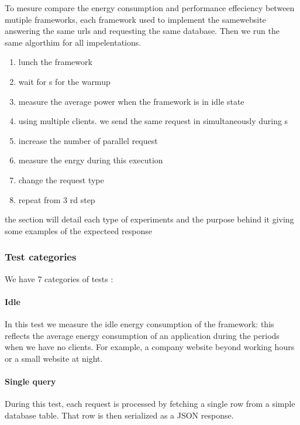 To mesure compare the energy consumption and performance effeciency between mutiple frameworks, each framework used to implement the samewebsite answering the same urls and requesting the same database. Then we run the same algorthim for all impelentations.
\begin{enumerate}
    \item lunch the framework
    \item wait for \duration s for the warmup
    \item measure the average power when the framework is in idle state
    \item using multiple clients. we send the same request in simultaneously during \duration s
    \item increase the number of parallel request
    \item measure the enrgy during this execution
    \item change the request type
    \item repeat from 3 rd step
\end{enumerate}
the section will detail each type of experiments  and the purpose behind it giving some examples of the expecteed response

\subsubsection{Test categories }
We have 7 categories of tests :

\paragraph{Idle}
In this test we measure the idle energy consumption of the framework: this reflects the average energy consumption of an application during the periods when we have no clients.
For example, a company website beyond working hours or a small website at night.


\paragraph{Single query}
During this test, each request  is processed by fetching a single row from a simple database table. That row is then serialized as a JSON response.

